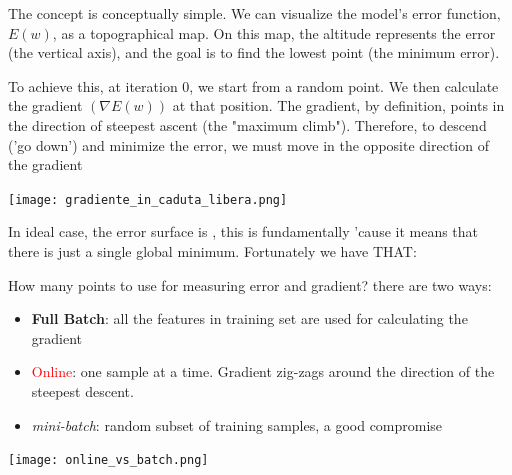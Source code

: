 The concept is conceptually simple. We can visualize the model's error function, $E(w)$, as a topographical map. On this map, the altitude represents the error (the vertical axis), and the goal is to find the lowest point (the minimum error).

To achieve this, at iteration 0, we start from a random point. We then calculate the gradient $(\nabla E(w))$ at that position. The gradient, by definition, points in the direction of steepest ascent (the "maximum climb"). Therefore, to descend ('go down') and minimize the error, we must move in the opposite direction of the gradient
\begin{center}
    \texttt{[image: gradiente\_in\_caduta\_libera.png]}
\end{center}

In ideal case, the error surface is , this is fundamentally 'cause it means that there is just a single global minimum. Fortunately we have THAT:

How many points to use for measuring error and gradient? there are two ways:
\begin{itemize}
    \item \textbf{Full Batch}: all the features in training set are used for calculating the gradient
    \item \textcolor{red}{Online}: one sample at a time. Gradient zig-zags around the direction of the steepest descent.
    \item \textit{mini-batch}: random subset of training samples, a good compromise 
\end{itemize}

\begin{center}
    \texttt{[image: online\_vs\_batch.png]}
\end{center}

